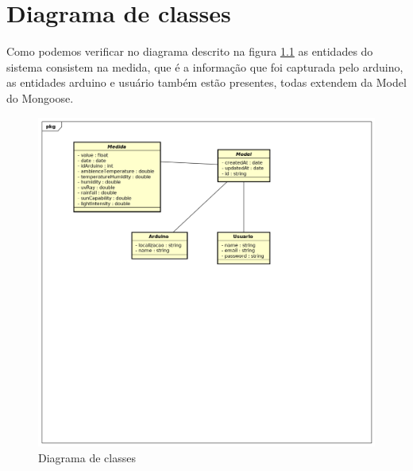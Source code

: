 \chapter{Diagrama de classes}

Como podemos verificar no diagrama descrito na figura \ref{figure_diagrama_classe} as entidades do sistema consistem na medida, que é a informação que foi capturada pelo arduino, as entidades arduino e usuário também estão presentes, todas extendem da Model do Mongoose.

\begin{figure}[H]
    \label{figure_diagrama_classe}
    \centering
    \caption{Diagrama de classes}
    \includegraphics[scale=0.5]{diagrams/classe.png}
    \hfill
\end{figure}
